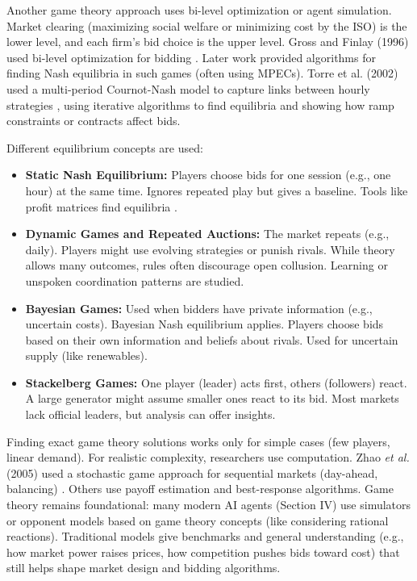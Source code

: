\documentclass[conference]{IEEEtran}
\begin{document}
Another game theory approach uses bi-level optimization or agent simulation. Market clearing (maximizing social welfare or minimizing cost by the ISO) is the lower level, and each firm’s bid choice is the upper level. Gross and Finlay (1996) used bi-level optimization for bidding \cite{Gross1996}. Later work provided algorithms for finding Nash equilibria in such games (often using MPECs). Torre et al. (2002) used a multi-period Cournot-Nash model to capture links between hourly strategies \cite{Torre2002}, using iterative algorithms to find equilibria and showing how ramp constraints or contracts affect bids.

Different equilibrium concepts are used:
\begin{itemize}
    \item \textbf{Static Nash Equilibrium:} Players choose bids for one session (e.g., one hour) at the same time. Ignores repeated play but gives a baseline. Tools like profit matrices find equilibria \cite{Ferrero1997}.
    \item \textbf{Dynamic Games and Repeated Auctions:} The market repeats (e.g., daily). Players might use evolving strategies or punish rivals. While theory allows many outcomes, rules often discourage open collusion. Learning or unspoken coordination patterns are studied.
    \item \textbf{Bayesian Games:} Used when bidders have private information (e.g., uncertain costs). Bayesian Nash equilibrium applies. Players choose bids based on their own information and beliefs about rivals. Used for uncertain supply (like renewables).
    \item \textbf{Stackelberg Games:} One player (leader) acts first, others (followers) react. A large generator might assume smaller ones react to its bid. Most markets lack official leaders, but analysis can offer insights.
\end{itemize}

Finding exact game theory solutions works only for simple cases (few players, linear demand). For realistic complexity, researchers use computation. Zhao \textit{et al.} (2005) used a stochastic game approach for sequential markets (day-ahead, balancing) \cite{Zhao2005}. Others use payoff estimation and best-response algorithms. Game theory remains foundational: many modern AI agents (Section IV) use simulators or opponent models based on game theory concepts (like considering rational reactions). Traditional models give benchmarks and general understanding (e.g., how market power raises prices, how competition pushes bids toward cost) that still helps shape market design and bidding algorithms.
\end{document}
